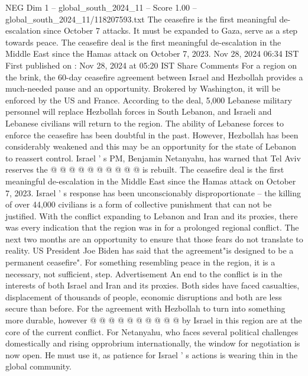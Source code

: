 \begin{textsample}{NEG Dim 1 – global\_south\_2024\_11 – Score 1.00 – global\_south\_2024\_11/118207593.txt}  \label{ex:f1_neg_201}
The ceasefire is the first meaningful de-escalation since October 7 attacks.
It must be expanded to Gaza, serve as a step towards peace.
The ceasefire deal is the first meaningful de-escalation in the Middle East since the Hamas attack on October 7, 2023.
Nov 28, 2024 06:34 IST First published on : Nov 28, 2024 at 05:20 IST Share Comments For a region on the brink, the 60-day ceasefire agreement between Israel and Hezbollah provides a much-needed pause and an opportunity.
Brokered by Washington, it will be enforced by the US and France.
According to the deal, 5,000 Lebanese military personnel will replace Hezbollah forces in South Lebanon, and Israeli and Lebanese civilians will return to the region.
The ability of Lebanese forces to enforce the ceasefire has been doubtful in the past.
However, Hezbollah has been considerably weakened and this may be an opportunity for the state of Lebanon to reassert control.
Israel ' s PM, Benjamin Netanyahu, has warned that Tel Aviv reserves the @ @ @ @ @ @ @ @ @ @ is rebuilt.
The ceasefire deal is the first meaningful de-escalation in the Middle East since the Hamas attack on October 7, 2023.
Israel ' s response has been unconscionably disproportionate -- the killing of over 44,000 civilians is a form of collective punishment that can not be justified.
With the conflict expanding to Lebanon and Iran and its proxies, there was every indication that the region was in for a prolonged regional conflict.
The next two months are an opportunity to ensure that those fears do not translate to reality.
US President Joe Biden has said that the agreement"is designed to be a permanent ceasefire".
For something resembling peace in the region, it is a necessary, not sufficient, step.
Advertisement An end to the conflict is in the interests of both Israel and Iran and its proxies.
Both sides have faced casualties, displacement of thousands of people, economic disruptions and both are less secure than before.
For the agreement with Hezbollah to turn into something more durable, however @ @ @ @ @ @ @ @ @ @ by Israel in this region are at the core of the current conflict.
For Netanyahu, who faces several political challenges domestically and rising opprobrium internationally, the window for negotiation is now open.
He must use it, as patience for Israel ' s actions is wearing thin in the global community.

\end{textsample}
